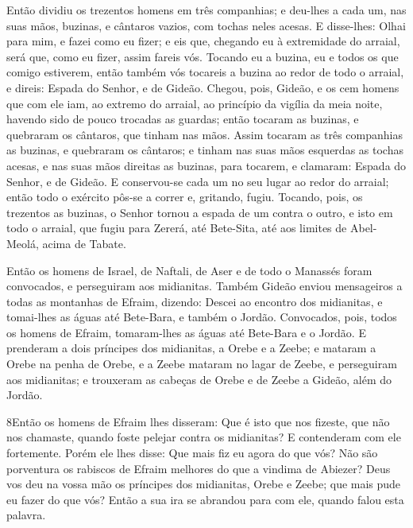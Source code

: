 Então dividiu os trezentos homens em três companhias; e deu-lhes
a cada um, nas suas mãos, buzinas, e cântaros vazios, com tochas
neles acesas. E disse-lhes: Olhai para mim, e fazei como eu
fizer; e eis que, chegando eu à extremidade do arraial, será que,
como eu fizer, assim fareis vós. Tocando eu a buzina, eu e
todos os que comigo estiverem, então também vós tocareis a buzina ao
redor de todo o arraial, e direis: Espada do Senhor, e de Gideão.
Chegou, pois, Gideão, e os cem homens que com ele iam, ao
extremo do arraial, ao princípio da vigília da meia noite, havendo
sido de pouco trocadas as guardas; então tocaram as buzinas, e
quebraram os cântaros, que tinham nas mãos. Assim tocaram as
três companhias as buzinas, e quebraram os cântaros; e tinham nas
suas mãos esquerdas as tochas acesas, e nas suas mãos direitas as
buzinas, para tocarem, e clamaram: Espada do Senhor, e de Gideão.
E conservou-se cada um no seu lugar ao redor do arraial;
então todo o exército pôs-se a correr e, gritando, fugiu.
Tocando, pois, os trezentos as buzinas, o Senhor tornou a
espada de um contra o outro, e isto em todo o arraial, que fugiu
para Zererá, até Bete-Sita, até aos limites de Abel-Meolá, acima de
Tabate.

Então os homens de Israel, de Naftali, de Aser e de todo o
Manassés foram convocados, e perseguiram aos midianitas.
Também Gideão enviou mensageiros a todas as montanhas de
Efraim, dizendo: Descei ao encontro dos midianitas, e tomai-lhes as
águas até Bete-Bara, e também o Jordão. Convocados, pois, todos os
homens de Efraim, tomaram-lhes as águas até Bete-Bara e o Jordão.
E prenderam a dois príncipes dos midianitas, a Orebe e a
Zeebe; e mataram a Orebe na penha de Orebe, e a Zeebe mataram no
lagar de Zeebe, e perseguiram aos midianitas; e trouxeram as cabeças
de Orebe e de Zeebe a Gideão, além do Jordão.

\medskip

\lettrine{8} Então os homens de Efraim lhes disseram: Que é
isto que nos fizeste, que não nos chamaste, quando foste pelejar
contra os midianitas? E contenderam com ele fortemente. Porém
ele lhes disse: Que mais fiz eu agora do que vós? Não são porventura
os rabiscos de Efraim melhores do que a vindima de Abiezer? Deus
vos deu na vossa mão os príncipes dos midianitas, Orebe e Zeebe; que
mais pude eu fazer do que vós? Então a sua ira se abrandou para com
ele, quando falou esta palavra.

